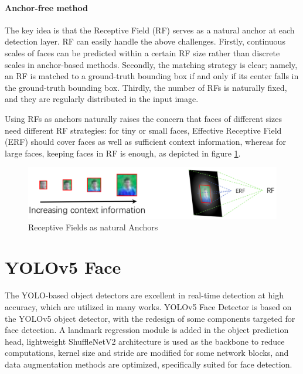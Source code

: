 \paragraph{Anchor-free method}
The key idea is that the Receptive Field (RF) serves as a natural anchor at each detection layer. RF can easily handle the above challenges. Firstly, continuous scales of faces can be predicted within a certain RF size rather than discrete scales in anchor-based methods. Secondly, the matching strategy is clear; namely, an RF is matched to a ground-truth bounding box if and only if its center falls in the ground-truth bounding box. Thirdly, the number of RFs is naturally fixed, and they are regularly distributed in the input image.

Using RFs as anchors naturally raises the concern that faces of different sizes need different RF strategies: for tiny or small faces, Effective Receptive Field (ERF) should cover faces as well as sufficient context information, whereas for large faces, keeping faces in RF is enough, as depicted in figure \ref{fig:RFasAnchor}.

\begin{figure}[h]
  \centering
    \includegraphics[width=1.0\textwidth]{LiteratureSurvey/RFasAnchor}
    \caption[Receptive Field as Anchor]{Receptive Fields as natural Anchors}
    \label{fig:RFasAnchor} 
\end{figure}


\section{YOLOv5 Face}
The YOLO-based object detectors are excellent in real-time detection at high accuracy, which are utilized in many works. YOLOv5 Face Detector \cite{yolov5face2021} is based on the YOLOv5 object detector, with the redesign of some components targeted for face detection. A landmark regression module is added in the object prediction head, lightweight ShuffleNetV2 architecture is used as the backbone to reduce computations, kernel size and stride are modified for some network blocks, and data augmentation methods are optimized, specifically suited for face detection.

